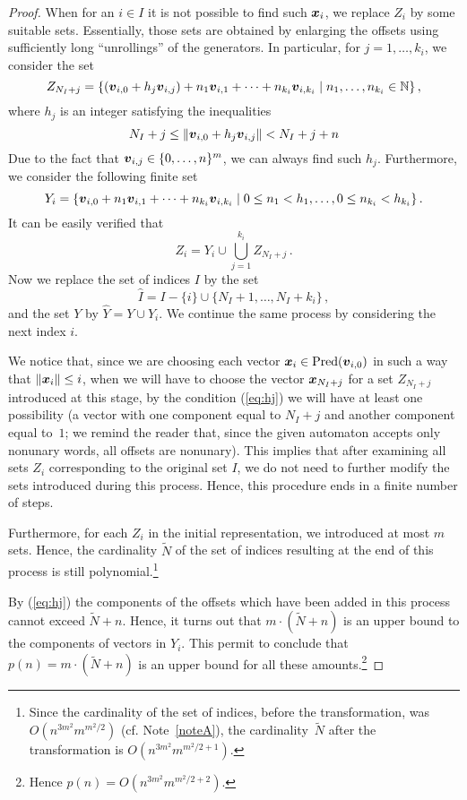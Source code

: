 \documentclass[11pt]{article}
\newcommand{\Pred}{\ensuremath{\mathrm{Pred}}}
\def\Vec#1{\mbox{\boldmath $#1$}}
\begin{document}
\begin{proof}
  When for an $i\in I$ it is not possible to find such $\Vec{x}_i$,
  we replace $Z_i$ by some suitable sets. Essentially, those sets are obtained by
  enlarging the offsets using sufficiently long ``unrollings'' of the generators.
  In particular, for $j=1,\ldots,k_i$, we consider the set
	\begin{equation}\label{eq:newZi}
		Z_{N_I+j} = \{(\Vec{v}_{i, 0}+h_j\Vec{v}_{i, j}) + n_1 \Vec{v}_{i, 1} + \cdots + n_{k_i} \Vec{v}_{i, k_i}\mid n_1, \ldots, n_{k_i} \in \mathbb{N}\}\,,
	\end{equation}
	where $h_j$ is an integer satisfying the inequalities
	\begin{equation}\label{eq:hj}
		N_I+j\le \|\Vec{v}_{i, 0}+h_j\Vec{v}_{i, j}\|<N_I+j+n
	\end{equation}
	Due to the fact that $\Vec{v}_{i, j}\in\{0,\ldots,n\}^m$, we can always find such $h_j$.
	Furthermore, we consider the following finite set
	\begin{equation}\label{eq:Yi}
		Y_i = \{\Vec{v}_{i, 0} + n_1 \Vec{v}_{i, 1} + \cdots + n_{k_i} \Vec{v}_{i, k_i}\mid 0\le n_1<h_1, \ldots, 0\le n_{k_i}<h_{k_i}\}\,.
	\end{equation}
  It can be easily verified that
  \[
  Z_i=Y_i\cup\bigcup_{j=1}^{k_i}Z_{N_I+j}\,.
  \]  
  Now we replace the set of indices $I$ by the set
  \[
  \widehat I=I-\{i\}\cup\{N_I+1,\ldots,N_I+k_i\}\,,
  \]
  and the set $Y$ by $\widehat Y=Y\cup Y_i$. We continue the same process by considering the next index $i$.
  
  We notice that, since we are choosing each vector $\Vec{x}_i\in\Pred(\Vec{v}_{i, 0})$ in such a way that
  $\|\Vec{x}_i\|\le i$, when we will have to choose the vector $\Vec{x}_{N_I+j}$ for a set
  $Z_{N_I+j}$ introduced at this stage, by the condition (\ref{eq:hj})
  we will have at least one possibility (a vector with one component equal to $N_I+j$ and another component
  equal to~$1$; we remind the reader that, since the given automaton accepts only nonunary words, 
  all offsets are nonunary).
  This implies that after examining all sets $Z_i$ corresponding to the original set $I$, we do not need
  to further modify the sets introduced during this process. Hence, this procedure ends in a finite number of steps.
  
  Furthermore, for each $Z_i$ in the initial representation, we introduced at most $m$
  sets. Hence, the cardinality $\widetilde N$ of the set of indices resulting at the end of this process 
  is still polynomial.\footnote{Since the cardinality of the set of indices, before the transformation, was~$O(n^{3m^2}m^{m^2\!/2})$ 
  (cf. Note~\ref{noteA}),
  the cardinality~$\widetilde N$ after the transformation is $O(n^{3m^2}m^{m^2\!/2+1})$.\label{noteB}}

  By (\ref{eq:hj}) the components of the offsets which have been added in this process cannot
  exceed $\widetilde N + n$. Hence, it turns out that $m\cdot(\widetilde N+n)$ is an upper
  bound to the components of vectors in $Y_i$. This permit to conclude that $p(n)=m\cdot(\widetilde N+n)$
  is an upper bound for all these amounts.\footnote{Hence $p(n)=O(n^{3m^2}m^{m^2/2+2})$.\label{noteC}}\end{proof}
\end{document}
